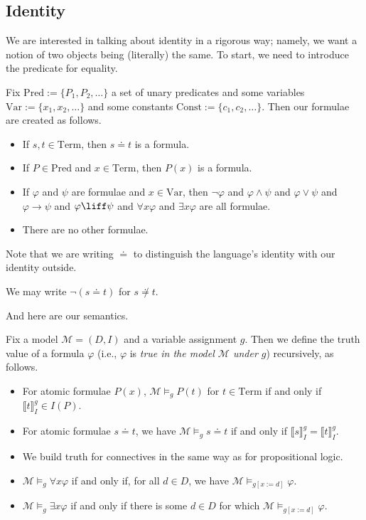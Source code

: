 \subsection{Identity}
We are interested in talking about identity in a rigorous way; namely, we want a notion of two objects being (literally) the same. To start, we need to introduce the predicate for equality.
\begin{defihelper}
	Fix $\mathrm{Pred}:=\{P_1,P_2,\ldots\}$ a set of unary predicates and some variables $\mathrm{Var}:=\{x_1,x_2,\ldots\}$ and some constants $\mathrm{Const}:=\{c_1,c_2,\ldots\}$. Then our formulae are created as follows.
	\begin{itemize}
		\item If $s,t\in\mathrm{Term}$, then $s\doteq t$ is a formula.
		\item If $P\in\mathrm{Pred}$ and $x\in\mathrm{Term}$, then $P(x)$ is a formula.
		\item If $\varphi$ and $\psi$ are formulae and $x\in\mathrm{Var}$, then $\lnot\varphi$ and $\varphi\land\psi$ and $\varphi\lor\psi$ and $\varphi\to\psi$ and $\varphi\liff\psi$ and $\forall x\varphi$ and $\exists x\varphi$ are all formulae.
		\item There are no other formulae.
	\end{itemize}
\end{defihelper}
Note that we are writing $\doteq $ to distinguish the language's identity with our identity outside.
\begin{notation}
	We may write $\lnot(s\doteq t)$ for $s\not\doteq t$.
\end{notation}
And here are our semantics.
\begin{defihelper}[Truth]
	Fix a model $\mathcal M=(D,I)$ and a variable assignment $g$. Then we define the truth value of a formula $\varphi$ (i.e., $\varphi$ is \textit{true in the model $\mathcal M$ under $g$}) recursively, as follows.
	\begin{itemize}
		\item For atomic formulae $P(x)$, $\mathcal M\models_gP(t)$ for $t\in\mathrm{Term}$ if and only if $\llbracket t\rrbracket_I^g\in I(P)$.
		\item For atomic formulae $s\doteq t$, we have $\mathcal M\models_gs\doteq t$ if and only if $\llbracket s\rrbracket_I^g=\llbracket t\rrbracket_I^g$.
		\item We build truth for connectives in the same way as for propositional logic.
		\item $\mathcal M\models_g\forall x\varphi$ if and only if, for all $d\in D$, we have $\mathcal M\models_{g[x:=d]}\varphi$.
		\item $\mathcal M\models_g\exists x\varphi$ if and only if there is some $d\in D$ for which $\mathcal M\models_{g[x:=d]}\varphi$.
	\end{itemize}
\end{defihelper}
